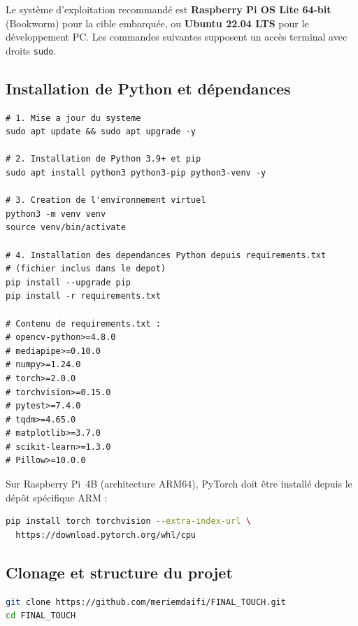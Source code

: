 \documentclass[12pt,a4paper]{report}
\begin{document}
Le syst\`eme d'exploitation recommand\'e est \textbf{Raspberry Pi OS Lite 64-bit} (Bookworm) pour la cible embarqu\'ee, ou \textbf{Ubuntu 22.04 LTS} pour le d\'eveloppement PC. Les commandes suivantes supposent un acc\`es terminal avec droits \texttt{sudo}.

\subsection{Installation de Python et d\'ependances}

\begin{lstlisting}[style=python, caption={Installation de l'environnement Python DMS}, label=lst:install]
# 1. Mise a jour du systeme
sudo apt update && sudo apt upgrade -y

# 2. Installation de Python 3.9+ et pip
sudo apt install python3 python3-pip python3-venv -y

# 3. Creation de l'environnement virtuel
python3 -m venv venv
source venv/bin/activate

# 4. Installation des dependances Python depuis requirements.txt
# (fichier inclus dans le depot)
pip install --upgrade pip
pip install -r requirements.txt

# Contenu de requirements.txt :
# opencv-python>=4.8.0
# mediapipe>=0.10.0
# numpy>=1.24.0
# torch>=2.0.0
# torchvision>=0.15.0
# pytest>=7.4.0
# tqdm>=4.65.0
# matplotlib>=3.7.0
# scikit-learn>=1.3.0
# Pillow>=10.0.0
\end{lstlisting}

\noindent Sur Raspberry Pi~4B (architecture ARM64), PyTorch doit être install\'e depuis le d\'ep\^ot sp\'ecifique ARM :
\begin{lstlisting}[language=bash, caption={Installation de PyTorch sur Raspberry Pi}]
pip install torch torchvision --extra-index-url \
  https://download.pytorch.org/whl/cpu
\end{lstlisting}

\subsection{Clonage et structure du projet}

\begin{lstlisting}[language=bash, caption={Clonage du d\'ep\^ot DMS}]
git clone https://github.com/meriemdaifi/FINAL_TOUCH.git
cd FINAL_TOUCH
\end{lstlisting}
\end{document}

